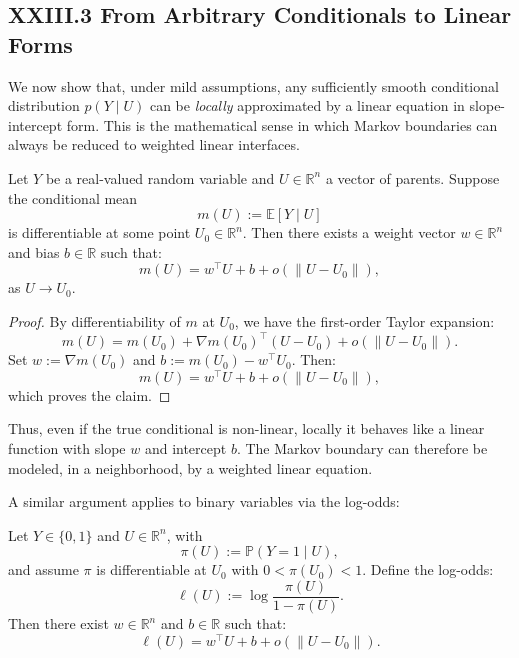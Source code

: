 \documentclass[11pt,letterpaper]{article}
\begin{document}
\subsection{XXIII.3 From Arbitrary Conditionals to Linear Forms}

We now show that, under mild assumptions, any sufficiently smooth conditional distribution $p(Y \mid U)$ can be \emph{locally} approximated by a linear equation in slope-intercept form. This is the mathematical sense in which Markov boundaries can always be reduced to weighted linear interfaces.

\begin{lemma}
Let $Y$ be a real-valued random variable and $U \in \mathbb{R}^n$ a vector of parents. Suppose the conditional mean
\[
m(U) := \mathbb{E}[Y \mid U]
\]
is differentiable at some point $U_0 \in \mathbb{R}^n$. Then there exists a weight vector $w \in \mathbb{R}^n$ and bias $b \in \mathbb{R}$ such that:
\[
m(U) = w^\top U + b + o(\|U - U_0\|),
\]
as $U \to U_0$.
\end{lemma}

\begin{proof}
By differentiability of $m$ at $U_0$, we have the first-order Taylor expansion:
\[
m(U) = m(U_0) + \nabla m(U_0)^\top (U - U_0) + o(\|U - U_0\|).
\]
Set $w := \nabla m(U_0)$ and $b := m(U_0) - w^\top U_0$. Then:
\[
m(U) = w^\top U + b + o(\|U - U_0\|),
\]
which proves the claim.
\end{proof}

Thus, even if the true conditional is non-linear, locally it behaves like a linear function with slope $w$ and intercept $b$. The Markov boundary can therefore be modeled, in a neighborhood, by a weighted linear equation.

A similar argument applies to binary variables via the log-odds:

\begin{lemma}
Let $Y \in \{0,1\}$ and $U \in \mathbb{R}^n$, with
\[
\pi(U) := \mathbb{P}(Y=1 \mid U),
\]
and assume $\pi$ is differentiable at $U_0$ with $0 < \pi(U_0) < 1$. Define the log-odds:
\[
\ell(U) := \log \frac{\pi(U)}{1-\pi(U)}.
\]
Then there exist $w \in \mathbb{R}^n$ and $b \in \mathbb{R}$ such that:
\[
\ell(U) = w^\top U + b + o(\|U - U_0\|).
\]
\end{lemma}
\end{document}

